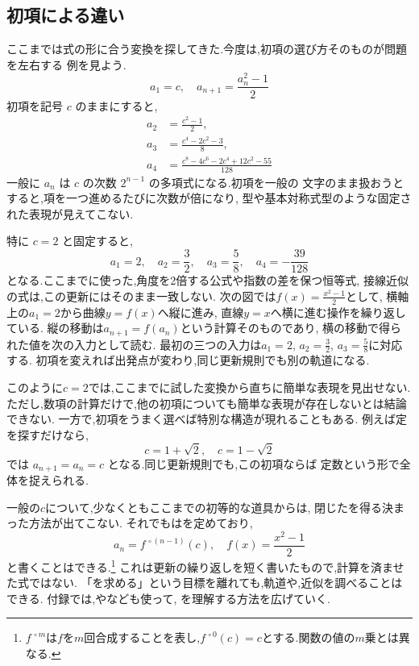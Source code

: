 \subsection{初項による違い}\label{節：初項依存型}

ここまでは式の形に合う変換を探してきた.今度は,初項の選び方そのものが問題を左右する
例を見よう.
\[
  a_1=c,
  \quad
  a_{n+1}=\frac{a_n^2-1}{2}
\]
初項を記号 $c$ のままにすると,
\begin{align*}
  a_2&=\frac{c^2-1}{2},\\
  a_3&=\frac{c^4-2c^2-3}{8},\\
  a_4&=\frac{c^8-4c^6-2c^4+12c^2-55}{128}
\end{align*}
一般に $a_n$ は $c$ の次数 $2^{n-1}$ の多項式になる.初項を一般の
文字のまま扱おうとすると,項を一つ進めるたびに次数が倍になり,
型や基本対称式型のような固定された表現が見えてこない.

特に $c=2$ と固定すると,
\[
  a_1=2,
  \quad
  a_2=\frac{3}{2},
  \quad
  a_3=\frac{5}{8},
  \quad
  a_4=-\frac{39}{128}
\]
となる.ここまでに使った,角度を2倍する公式や指数の差を保つ恒等式,
接線近似の式は,この更新にはそのまま一致しない.
  次の図では$f(x)=\displaystyle\frac{x^2-1}{2}$として,
  横軸上の$a_1=2$から曲線$y=f(x)$へ縦に進み,
  直線$y=x$へ横に進む操作を繰り返している.
  縦の移動は$a_{n+1}=f(a_n)$という計算そのものであり,
  横の移動で得られた値を次の入力として読む.
  最初の三つの入力は$a_1=2,\,a_2=\displaystyle\frac32,\,
  a_3=\displaystyle\frac58$に対応する.
  初項を変えれば出発点が変わり,同じ更新規則でも別の軌道になる.
  \BookFigCobweb

このように$c=2$では,ここまでに試した変換から直ちに簡単な表現を見出せない.ただし,数項の計算だけで,他の初項についても簡単な表現が存在しないとは結論できない.
一方で,初項をうまく選べば特別な構造が現れることもある.
例えば定を探すだけなら,
\[
  c=1+\sqrt{2},
  \quad
  c=1-\sqrt{2}
\]
では $a_{n+1}=a_n=c$ となる.同じ更新規則でも,この初項ならば
定数という形で全体を捉えられる.

一般の$c$について,少なくともここまでの初等的な道具からは,
閉じたを得る決まった方法が出てこない.
それでもはを定めており,
\[
  a_n=f^{\,\circ(n-1)}(c),
  \quad
  f(x)=\frac{x^2-1}{2}
\]
と書くことはできる.\footnote{$f^{\,\circ m}$は$f$を$m$回合成することを表し,$f^{\,\circ0}(c)=c$とする.関数の値の$m$乗とは異なる.}
これは更新の繰り返しを短く書いたもので,計算を済ませた式ではない.
「を求める」という目標を離れても,軌道や,近似を調べることはできる.
付録では,やなども使って,
を理解する方法を広げていく.

